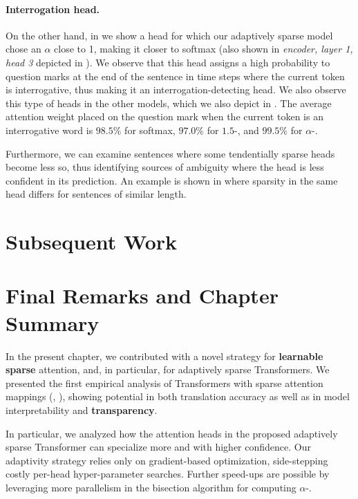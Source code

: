 \paragraph*{Interrogation head.}
On the other hand, in  we show a head for which our
adaptively sparse model chose an $\alpha$ close to 1, making it
closer to softmax (also shown in {\it encoder, layer 1, head 3}
depicted in ). We observe that this head
assigns a high probability to question marks at the end of the
sentence in time steps where the current token is interrogative, thus
making it an interrogation-detecting head. We also observe this type
of heads in the other models, which we also depict in
. The average attention weight placed on the
question mark when the current token is an interrogative word is
$98.5\%$ for softmax, $97.0\%$ for $1.5$-\entmaxtext, and $99.5\%$
for $\alpha$-\entmaxtext.

Furthermore, we can examine sentences where some tendentially sparse
heads become less so, thus identifying sources of ambiguity where the
head is less confident in its prediction. An example is shown in
 where sparsity in the same head differs
for sentences of similar length.

\section{Subsequent Work}

\section{Final Remarks and Chapter Summary}

In the present chapter, we contributed with a novel strategy for
\textbf{learnable sparse} attention, and, in particular, for adaptively
sparse Transformers. We presented the first empirical analysis of
Transformers with sparse attention mappings (\ie, \entmaxtext),
showing potential in both translation accuracy as well as in model
interpretability and \textbf{transparency}.

In particular, we analyzed how the attention heads in the proposed
adaptively sparse Transformer can specialize more and with higher
confidence. Our adaptivity strategy relies only on gradient-based
optimization, side-stepping costly per-head hyper-parameter searches.
Further speed-ups are possible by leveraging more parallelism in the
bisection algorithm for computing $\alpha$-\entmaxtext.

\cleardoublepage
